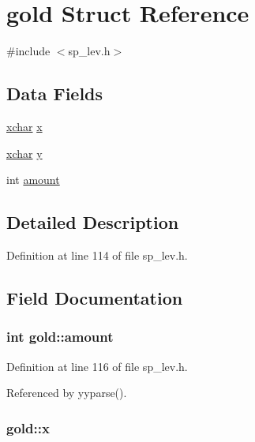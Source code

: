 \hypertarget{structgold}{\section{gold Struct Reference}
\label{structgold}
}


{\ttfamily \#include $<$sp\+\_\+lev.\+h$>$}

\subsection*{Data Fields}
\begin{DoxyCompactItemize}
\item 
\hyperlink{global_8h_a2043b7d01ce89f4ee2fa6c345a752d32}{xchar} \hyperlink{structgold_abaa43c4f80e6054cda72314ca7928876}{x}
\item 
\hyperlink{global_8h_a2043b7d01ce89f4ee2fa6c345a752d32}{xchar} \hyperlink{structgold_a1fe44e270a7b537b490afa2151efd436}{y}
\item 
int \hyperlink{structgold_acc8afa075b6fc7f2d698b5d6d34f2b75}{amount}
\end{DoxyCompactItemize}


\subsection{Detailed Description}


Definition at line 114 of file sp\+\_\+lev.\+h.



\subsection{Field Documentation}
\hypertarget{structgold_acc8afa075b6fc7f2d698b5d6d34f2b75}{
\subsubsection[{amount}]{\setlength{\rightskip}{0pt plus 5cm}int gold\+::amount}}\label{structgold_acc8afa075b6fc7f2d698b5d6d34f2b75}


Definition at line 116 of file sp\+\_\+lev.\+h.



Referenced by yyparse().

\hypertarget{structgold_abaa43c4f80e6054cda72314ca7928876}{
\subsubsection[{x}]{ gold\+::x}}\label{structgold_abaa43c4f80e6054cda72314ca7928876}


